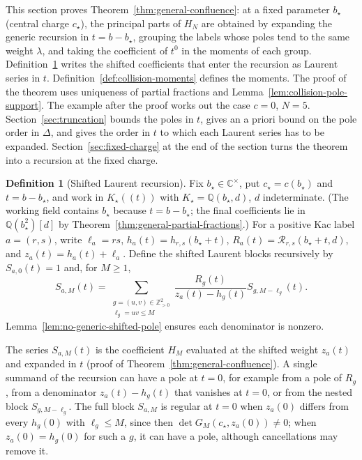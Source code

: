 \documentclass[twoside,10pt]{article}
\numberwithin{equation}{section}
\theoremstyle{slbody}
\theoremstyle{definition}
\newtheorem{definition}[theorem]{Definition}
\theoremstyle{remark}
\begin{document}
This section proves Theorem~\ref{thm:general-confluence}: at a fixed
parameter \(b_\star\) (central charge \(c_\star\)), the principal parts of \(H_N\) are obtained by expanding the
generic recursion in \(t=b-b_\star\), grouping the labels whose poles tend to
the same weight \(\lambda\), and taking the coefficient of \(t^0\) in the
moments of each group.  Definition~\ref{def:shifted-laurent} writes the
shifted coefficients that enter the recursion as Laurent series in \(t\).
Definition~\ref{def:collision-moments} defines the moments.  The proof of
the theorem uses uniqueness of partial fractions and
Lemma~\ref{lem:collision-pole-support}.  The example after the proof works out
the case \(c=0\), \(N=5\).  Section~\ref{sec:truncation} bounds the poles
in \(t\), gives an a priori bound on the pole order in \(\Delta\), and gives
the order in \(t\) to which each Laurent series has to be expanded.
Section~\ref{sec:fixed-charge} at the end of the section turns the theorem
into a recursion at the fixed charge.

\begin{definition}[Shifted Laurent recursion]\label{def:shifted-laurent}
Fix \(b_\star\in\mathbb C^\times\), put \(c_\star=c(b_\star)\) and
\(t=b-b_\star\), and work in \(K_\star((t))\) with
\(K_\star=\mathbb Q(b_\star,d)\), \(d\) indeterminate.  (The working field
contains \(b_\star\) because \(t=b-b_\star\); the final coefficients lie in
\(\mathbb Q(b_\star^2)[d]\) by Theorem~\ref{thm:general-partial-fractions}.)
For a positive Kac label \(a=(r,s)\), write \(\ell_a=rs\),
\(h_a(t)=h_{r,s}(b_\star+t)\), \(R_a(t)={\mathcal R}_{r,s}(b_\star+t,d)\), and
\(z_a(t)=h_a(t)+\ell_a\).
Define the shifted Laurent blocks recursively by \(S_{a,0}(t)=1\) and, for
\(M\geq1\),
\[
 S_{a,M}(t)
 =\sum_{\substack{g=(u,v)\in\mathbb Z_{>0}^2\\\ell_g=uv\leq M}}
 \frac{R_g(t)}
 {z_a(t)-h_g(t)}S_{g,M-\ell_g}(t).
\]
Lemma~\ref{lem:no-generic-shifted-pole} ensures each denominator is nonzero.
\end{definition}

The series \(S_{a,M}(t)\) is the coefficient \(H_M\) evaluated at the shifted
weight \(z_a(t)\) and expanded in \(t\) (proof of
Theorem~\ref{thm:general-confluence}).  A single summand of the recursion can
have a pole at \(t=0\), for example from a pole of \(R_g\), from a denominator
\(z_a(t)-h_g(t)\) that vanishes at \(t=0\), or from the nested block
\(S_{g,M-\ell_g}\).  The full block \(S_{a,M}\) is
regular at \(t=0\) when \(z_a(0)\) differs from every \(h_g(0)\) with
\(\ell_g\leq M\), since then \(\det G_M(c_\star,z_a(0))\neq0\); when
\(z_a(0)=h_g(0)\) for such a \(g\), it can have a pole, although cancellations
may remove it.
\end{document}
